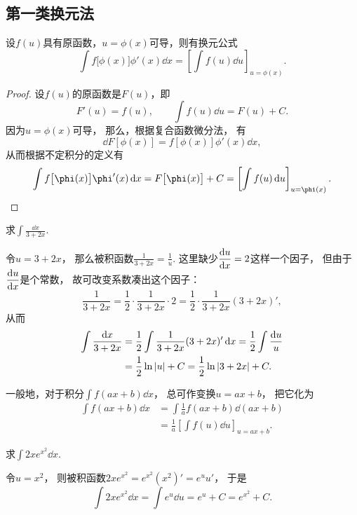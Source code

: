 \subsection{第一类换元法}
\begin{theorem}
设\(f(u)\)具有原函数，\(u=\phi(x)\)可导，则有换元公式\[
	\int f\bigl[\phi(x)\bigr] \phi'(x) \dd{x}
	= \left[ \int f(u) \dd{u} \right]_{u=\phi(x)}.
\]
\begin{proof}
设\(f(u)\)的原函数是\(F(u)\)，即\[
	F'(u) = f(u),
	\qquad
	\int f(u) \dd{u} = F(u) + C.
\]
因为\(u = \phi(x)\)可导，
那么，根据复合函数微分法，
有\[
	\dd{F\left[\phi(x)\right]} = f\left[\phi(x)\right] \phi'(x) \dd{x},
\]
从而根据不定积分的定义有\[
	\int f\bigl[\phi(x)\bigr] \phi'(x) \dd{x}
	= F\bigl[\phi(x)\bigr] + C
	= \left[ \int f(u) \dd{u} \right]_{u=\phi(x)}.
	\qedhere
\]
\end{proof}
\end{theorem}

\begin{example}
求\(\int \frac{\dd{x}}{3+2x}\).
\begin{solution}
令\(u = 3+2x\)，
那么被积函数\(\frac{1}{3+2x} = \frac{1}{u}\).
这里缺少\(\displaystyle\dv{u}{x}=2\)这样一个因子，
但由于\(\displaystyle\dv{u}{x}\)是个常数，
故可改变系数凑出这个因子：\[
	\frac{1}{3+2x}
	= \frac{1}{2} \cdot \frac{1}{3+2x} \cdot 2
	= \frac{1}{2} \cdot \frac{1}{3+2x} (3+2x)',
\]
从而\begin{align*}
	\int \frac{\dd{x}}{3+2x}
	&= \frac{1}{2} \int \frac{1}{3+2x} (3+2x)' \dd{x}
	= \frac{1}{2} \int \frac{\dd{u}}{u} \\
	&= \frac{1}{2} \ln\abs{u} + C
	= \frac{1}{2} \ln\abs{3+2x} + C.
\end{align*}
\end{solution}
\end{example}

\begin{remark}
一般地，对于积分\(\int f(ax+b) \dd{x}\)，
总可作变换\(u=ax+b\)，
把它化为\begin{align*}
	\int f(ax+b) \dd{x}
	&= \int \frac{1}{a} f(ax+b) \dd(ax+b) \\
	&= \frac{1}{a} \left[ \int f(u) \dd{u} \right]_{u=ax+b}.
\end{align*}
\end{remark}

\begin{example}
求\(\int 2x e^{x^2} \dd{x}\).
\begin{solution}
令\(u=x^2\)，
则被积函数\(2x e^{x^2} = e^{x^2} (x^2)' = e^u u'\)，
于是\[
	\int 2x e^{x^2} \dd{x}
	= \int e^u \dd{u}
	= e^u + C
	= e^{x^2} + C.
\]
\end{solution}
\end{example}

